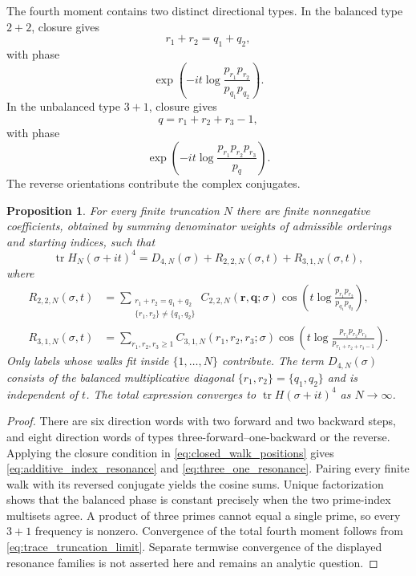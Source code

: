 \documentclass[11pt]{amsart}
\numberwithin{equation}{section}
\theoremstyle{plain}
\newtheorem{proposition}[theorem]{Proposition}
\theoremstyle{definition}
\theoremstyle{remark}
\newcommand{\tr}{\operatorname{tr}}
\begin{document}
The fourth moment contains two distinct directional types.  In the balanced type $2+2$, closure gives
\begin{equation}
r_1+r_2=q_1+q_2,
\label{eq:additive_index_resonance}
\end{equation}
with phase
\begin{equation}
\exp\left(-it\log\frac{p_{r_1}p_{r_2}}{p_{q_1}p_{q_2}}\right).
\label{eq:multiplicative_phase}
\end{equation}
In the unbalanced type $3+1$, closure gives
\begin{equation}
q=r_1+r_2+r_3-1,
\label{eq:three_one_resonance}
\end{equation}
with phase
\begin{equation}
\exp\left(-it\log\frac{p_{r_1}p_{r_2}p_{r_3}}{p_q}\right).
\label{eq:three_one_phase}
\end{equation}
The reverse orientations contribute the complex conjugates.

\begin{proposition}
\label{prop:fourth_structure}
For every finite truncation $N$ there are finite nonnegative coefficients, obtained by summing denominator weights of admissible orderings and starting indices, such that
\begin{equation}
\tr H_N(\sigma+it)^4
=D_{4,N}(\sigma)+R_{2,2,N}(\sigma,t)+R_{3,1,N}(\sigma,t),
\label{eq:fourth_moment_decomposition}
\end{equation}
where
\begin{align}
R_{2,2,N}(\sigma,t)
&=
\sum_{\substack{r_1+r_2=q_1+q_2\\
\{r_1,r_2\}\ne\{q_1,q_2\}}}
C_{2,2,N}(\mathbf r,\mathbf q;\sigma)
\cos\left(t\log\frac{p_{r_1}p_{r_2}}{p_{q_1}p_{q_2}}\right),
\label{eq:R22_definition}\\
R_{3,1,N}(\sigma,t)
&=
\sum_{r_1,r_2,r_3\ge1}
C_{3,1,N}(r_1,r_2,r_3;\sigma)
\cos\left(t\log\frac{p_{r_1}p_{r_2}p_{r_3}}
{p_{r_1+r_2+r_3-1}}\right).
\label{eq:R31_definition}
\end{align}
Only labels whose walks fit inside $\{1,\ldots,N\}$ contribute.  The term $D_{4,N}(\sigma)$ consists of the balanced multiplicative diagonal $\{r_1,r_2\}=\{q_1,q_2\}$ and is independent of $t$.  The total expression converges to $\tr H(\sigma+it)^4$ as $N\to\infty$.
\end{proposition}

\begin{proof}
There are six direction words with two forward and two backward steps, and eight direction words of types three-forward--one-backward or the reverse.  Applying the closure condition in \eqref{eq:closed_walk_positions} gives \eqref{eq:additive_index_resonance} and \eqref{eq:three_one_resonance}.  Pairing every finite walk with its reversed conjugate yields the cosine sums.  Unique factorization shows that the balanced phase is constant precisely when the two prime-index multisets agree.  A product of three primes cannot equal a single prime, so every $3+1$ frequency is nonzero.  Convergence of the total fourth moment follows from \eqref{eq:trace_truncation_limit}.  Separate termwise convergence of the displayed resonance families is not asserted here and remains an analytic question.
\end{proof}
\end{document}
